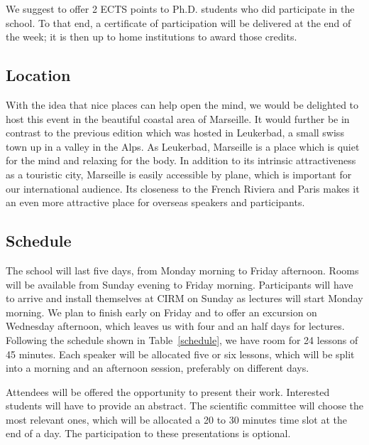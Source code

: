 \documentclass[a4paper]{scrartcl}
\begin{document}
We suggest to offer 2 ECTS points to Ph.D. students who did participate in the
school. To that end, a certificate of participation will be delivered at the end
of the week; it is then up to home institutions to award those credits.

\subsection{Location}

With the idea that nice places can help open the mind, we would be delighted to
host this event in the beautiful coastal area of Marseille. It would further be
in contrast to the previous edition which was hosted in Leukerbad, a small swiss
town up in a valley in the Alps. As Leukerbad, Marseille is a place which is
quiet for the mind and relaxing for the body. 
In addition to its intrinsic attractiveness as a touristic city, Marseille is
easily accessible by plane, which is important for our international audience.
Its closeness to the French Riviera and Paris makes it an even more attractive
place for overseas speakers and participants.

\subsection{Schedule}

The school will last five days, from Monday morning to Friday afternoon. Rooms
will be available from Sunday evening to Friday morning. Participants will have
to arrive and install themselves at CIRM on Sunday as lectures will start Monday
morning. We plan to finish early on Friday and to offer an excursion on
Wednesday afternoon, which leaves us with four and an half days for lectures.
Following the schedule shown in Table~\ref{schedule}, we have room for 24
lessons of 45 minutes. Each speaker will be allocated five or six lessons, which
will be split into a morning and an afternoon session, preferably on different
days.

Attendees will be offered the opportunity to present their work. Interested
students will have to provide an abstract. The scientific committee will choose
the most relevant ones, which will be allocated a 20 to 30 minutes time slot at
the end of a day. The participation to these presentations is optional.
\end{document}
